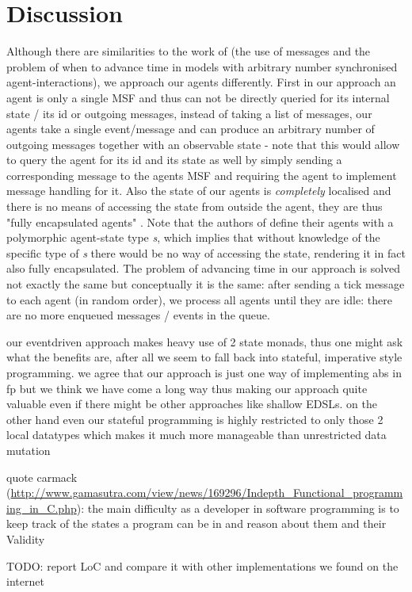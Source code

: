 \section{Discussion}
Although there are similarities to the work of \cite{botta_time_2010} (the use of messages and the problem of when to advance time in models with arbitrary number synchronised agent-interactions), we approach our agents differently. First in our approach an agent is only a single MSF and thus can not be directly queried for its internal state / its id or outgoing messages, instead of taking a list of messages, our agents take a single event/message and can produce an arbitrary number of outgoing messages together with an observable state - note that this would allow to query the agent for its id and its state as well by simply sending a corresponding message to the agents MSF and requiring the agent to implement message handling for it. Also the state of our agents is \textit{completely} localised and there is no means of accessing the state from outside the agent, they are thus "fully encapsulated agents" \cite{botta_time_2010}. Note that the authors of \cite{botta_time_2010} define their agents with a polymorphic agent-state type \textit{s}, which implies that without knowledge of the specific type of \textit{s} there would be no way of accessing the state, rendering it in fact also fully encapsulated. The problem of advancing time in our approach is solved not exactly the same but conceptually it is the same: after sending a tick message to each agent (in random order), we process all agents until they are idle: there are no more enqueued messages / events in the queue.

our eventdriven approach makes heavy use of 2 state monads, thus one might ask what the benefits are, after all we seem to fall back into stateful, imperative style programming. we agree that our approach is just one way of implementing abs in fp but we think we have come a long way thus making our approach quite valuable even if there might be other approaches like shallow EDSLs. on the other hand even our stateful programming is highly restricted to only those 2 local datatypes which makes it much more manageable than unrestricted data mutation

quote carmack (\url{http://www.gamasutra.com/view/news/169296/Indepth_Functional_programming_in_C.php}): the main difficulty as a developer in software programming is to keep track of the states a program can be in and reason about them and their Validity

TODO: report LoC and compare it with other implementations we found on the internet